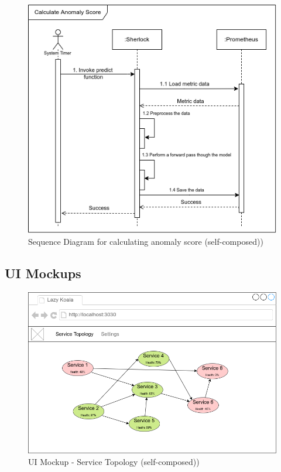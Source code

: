 \begin{figure}[H]
    \includegraphics[width=14cm]{assets/system-design/sequence-diagram-2.png}
    \caption{Sequence Diagram for calculating anomaly score (self-composed))}
\end{figure}

\subsection{UI Mockups}

\begin{figure}[H]
    \includegraphics[width=14cm]{assets/system-design/ui-home.png}
    \caption{UI Mockup - Service Topology  (self-composed))}
\end{figure}


